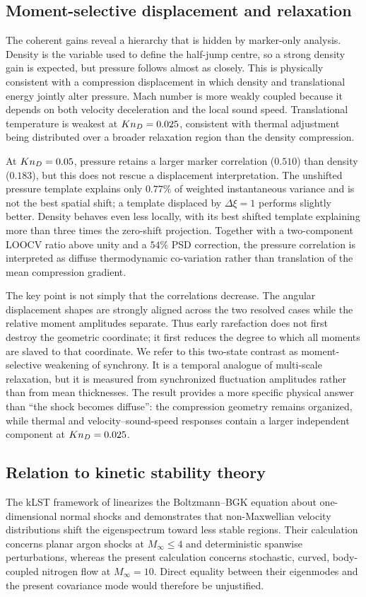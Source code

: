 \subsection{Moment-selective displacement and relaxation}
The coherent gains reveal a hierarchy that is hidden by marker-only analysis. Density is the variable used to define the half-jump centre, so a strong density gain is expected, but pressure follows almost as closely. This is physically consistent with a compression displacement in which density and translational energy jointly alter pressure. Mach number is more weakly coupled because it depends on both velocity deceleration and the local sound speed. Translational temperature is weakest at $Kn_D=0.025$, consistent with thermal adjustment being distributed over a broader relaxation region than the density compression.

At $Kn_D=0.05$, pressure retains a larger marker correlation ($0.510$) than density ($0.183$), but this does not rescue a displacement interpretation. The unshifted pressure template explains only $0.77\%$ of weighted instantaneous variance and is not the best spatial shift; a template displaced by $\Delta\xi=1$ performs slightly better. Density behaves even less locally, with its best shifted template explaining more than three times the zero-shift projection. Together with a two-component LOOCV ratio above unity and a $54\%$ PSD correction, the pressure correlation is interpreted as diffuse thermodynamic co-variation rather than translation of the mean compression gradient.

The key point is not simply that the correlations decrease. The angular displacement shapes are strongly aligned across the two resolved cases while the relative moment amplitudes separate. Thus early rarefaction does not first destroy the geometric coordinate; it first reduces the degree to which all moments are slaved to that coordinate. We refer to this two-state contrast as moment-selective weakening of synchrony. It is a temporal analogue of multi-scale relaxation, but it is measured from synchronized fluctuation amplitudes rather than from mean thicknesses. The result provides a more specific physical answer than ``the shock becomes diffuse'': the compression geometry remains organized, while thermal and velocity--sound-speed responses contain a larger independent component at $Kn_D=0.025$.

\subsection{Relation to kinetic stability theory}
The kLST framework of \citet{Karpuzcu2026} linearizes the Boltzmann--BGK equation about one-dimensional normal shocks and demonstrates that non-Maxwellian velocity distributions shift the eigenspectrum toward less stable regions. Their calculation concerns planar argon shocks at $M_\infty\leq4$ and deterministic spanwise perturbations, whereas the present calculation concerns stochastic, curved, body-coupled nitrogen flow at $M_\infty=10$. Direct equality between their eigenmodes and the present covariance mode would therefore be unjustified.


